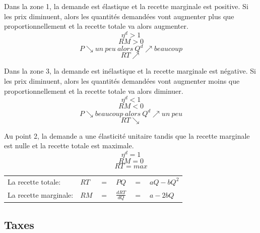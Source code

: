 \begin{minipage}{0.6\textwidth}
    Dans la zone 1, la demande est \textcolor[rgb]{1,0,0}{élastique} et la recette marginale est \textcolor[rgb]{1,0,0}{positive}.
		Si les prix diminuent, alors les quantités demandées vont \textcolor[rgb]{1,0,0}{augmenter plus} que proportionnellement et la recette totale va alors \textcolor[rgb]{1,0,0}{augmenter}.
		$$\eta^d > 1$$
		$$RM > 0$$
		$$P \searrow un\ peu\ alors\ Q^d \nearrow beaucoup$$
		$$RT \nearrow$$

		Dans la zone 3, la demande est \textcolor[rgb]{1,0,0}{inélastique} et la recette marginale est \textcolor[rgb]{1,0,0}{négative}.
		Si les prix diminuent, alors les quantités demandées vont \textcolor[rgb]{1,0,0}{augmenter} moins que proportionnellement et la recette totale va alors \textcolor[rgb]{1,0,0}{diminuer}.
		$$\eta^d < 1$$
		$$RM < 0$$
		$$P \searrow beaucoup\ alors\ Q^d \nearrow un\ peu$$
		$$RT \searrow$$

		Au point 2, la demande a une élasticité unitaire tandis que la recette marginale est nulle et la recette totale est maximale.
		$$\eta^d = 1$$
		$$RM = 0$$
		$$RT = max$$
    
    \begin{tabular}{llllll}
        La recette totale:    & $RT$ & $=$ & $PQ$ & $=$ & $aQ - bQ^2$\\
        La recette marginale: & $RM$ & $=$ & $\frac{dRT}{dQ}$ & $=$ & $a - 2bQ$\\
    \end{tabular}
\end{minipage}





\newpage
\subsection{Taxes}



